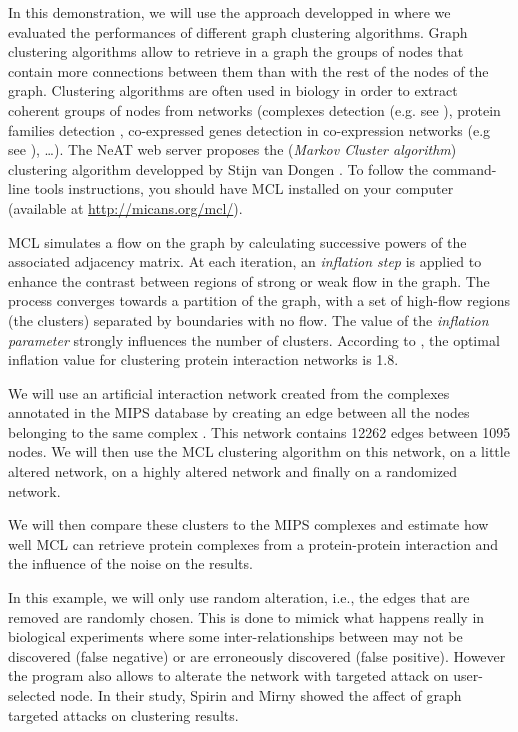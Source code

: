 In this demonstration, we will use the approach developped in \cite{Brohee2006} where we evaluated the performances of different graph clustering algorithms. Graph clustering algorithms allow to retrieve in a graph the groups of nodes that contain more connections between them than with the rest of the nodes of the graph. Clustering algorithms are often used in biology in order to extract coherent groups of nodes from networks (complexes detection (e.g. see \cite{Sharan2007,Krogan2006,Brohee2006,Pereira-Leal2004}), protein families detection \cite{Enright2002}, co-expressed genes detection in co-expression networks (e.g see \cite{Lattimore2005}), \ldots). The NeAT web server proposes the  (\textit{Markov Cluster algorithm}) clustering algorithm developped by Stijn van Dongen \cite{VanDongenPHD2000,Enright2002}. To follow the command-line tools instructions, you should have  MCL installed on your computer (available at \url{http://micans.org/mcl/}).

MCL simulates a flow on the graph by
calculating successive powers of the associated adjacency matrix. At
each iteration, an \textit{inflation step} is applied to enhance the
contrast between regions of strong or weak flow in the graph. The
process converges towards a partition of the graph, with a set of 
high-flow regions (the clusters) separated by boundaries with no 
flow. The value of the \textit{inflation parameter} strongly 
influences the number of clusters. According to \cite{Brohee2006}, the optimal inflation
value for clustering protein interaction networks is 1.8.

We will use an artificial interaction network created from the complexes annotated in the MIPS database by creating an edge between all the nodes belonging to the same complex \cite{Mewes2007}. This network contains 12262 edges between 1095 nodes. We will then use the MCL clustering algorithm on this network, on a little altered network, on a highly altered network and finally on a randomized network. 

We will then compare these clusters to the MIPS complexes and estimate how well MCL can retrieve protein complexes from a protein-protein interaction and the influence of the noise on the results.

In this example, we will only use random alteration, i.e., the edges that are removed are randomly chosen. This is done to mimick what happens really in biological experiments where some inter-relationships between may not be discovered (false negative) or are erroneously discovered (false positive). However the  program also allows to alterate the network with targeted attack on user-selected node. In their study, Spirin and Mirny \cite{Spirin2003} showed the affect of graph targeted attacks on clustering results.

